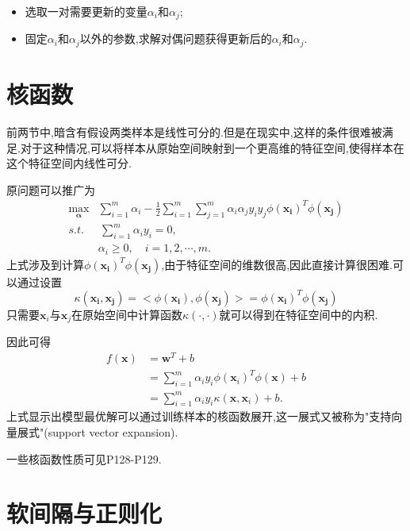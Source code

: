 \begin{itemize}
\item 选取一对需要更新的变量$\alpha_i$和$\alpha_j$;
\item 固定$\alpha_i$和$\alpha_j$以外的参数,求解对偶问题获得更新后的$\alpha_i$和$\alpha_j$.
\end{itemize}

\section{核函数}

前两节中,暗含有假设两类样本是线性可分的.但是在现实中,这样的条件很难被满足.对于这种情况,可以将样本从原始空间映射到一个更高维的特征空间,使得样本在这个特征空间内线性可分.

原问题可以推广为
\begin{equation}\begin{split}
\max_{\mathbf\alpha}&\sum_{i=1}^m\alpha_i-\frac{1}{2}\sum_{i=1}^m\sum_{j=1}^m\alpha_i\alpha_jy_iy_j\phi(\mathbf{x_i})^T\phi(\mathbf{x_j})\\
s.t.&\,\sum_{i=1}^m\alpha_iy_i=0,\\
&\alpha_i\ge 0,\quad i=1,2,\cdots,m.
\end{split}\end{equation}
上式涉及到计算$\phi(\mathbf{x_i})^T\phi(\mathbf{x_j})$,由于特征空间的维数很高,因此直接计算很困难.可以通过设置
\begin{equation}\kappa(\mathbf{x_i,x_j})=<\phi(\mathbf{x_i}),\phi(\mathbf{x_j})>=\phi(\mathbf{x_i})^T\phi(\mathbf{x_j})\end{equation}
只需要$\mathbf x_i$与$\mathbf x_j$在原始空间中计算函数$\kappa(\cdot,\cdot)$就可以得到在特征空间中的内积.

因此可得
\begin{equation}\begin{split}
f(\mathbf x)&=\mathbf w^T+b\\
&=\sum_{i=1}^m\alpha_iy_i\phi(\mathbf x_i)^T\phi(\mathbf x)+b\\
&=\sum_{i=1}^m\alpha_iy_i\kappa(\mathbf x,\mathbf x_i)+b.
\end{split}\end{equation}
上式显示出模型最优解可以通过训练样本的核函数展开,这一展式又被称为"支持向量展式"(support vector expansion).

一些核函数性质可见P128-P129.

\section{软间隔与正则化}

